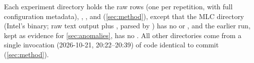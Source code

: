 Each experiment directory holds the raw rows (one per repetition, with full configuration metadata),
, ,  and  (\cref{sec:method}), except
that the MLC directory (Intel's binary; raw text output plus , parsed by
) has no  or , and the earlier
 run, kept as evidence for \cref{sec:anomalies}, has no
. All other directories come from a single  invocation (2026-10-21,
20:22--20:39) of code identical to commit  (\cref{sec:method}).
